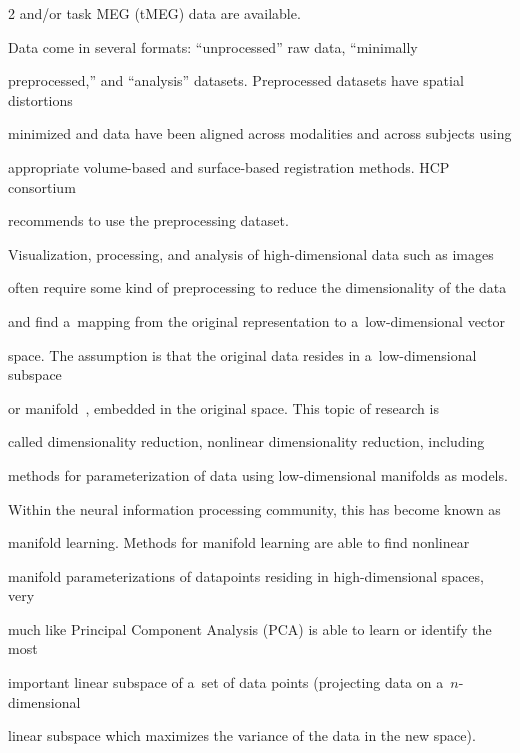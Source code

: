 \begin{multicols}{2}
and/or task MEG (tMEG) data are available.





  Data come in several formats: ``unprocessed'' raw data, ``minimally


preprocessed,'' and ``analysis'' datasets. Preprocessed datasets have spatial distortions


minimized and data have been aligned across modalities and across subjects using


appropriate volume-based and surface-based registration methods. HCP consortium


recommends to use the preprocessing dataset.





  Visualization, processing, and analysis of high-dimensional data such as images


often require some kind of preprocessing to reduce the dimensionality of the data


and find a~mapping from the original representation to a~low-dimensional vector


space. The assumption is that the original data resides in a~low-dimensional subspace


or manifold~\cite{69-kl}, embedded in the original space. This topic of research is


called dimensionality reduction, nonlinear dimensionality reduction, including


methods for parameterization of data using low-dimensional manifolds as models.


Within the neural information processing community, this has become known as


manifold learning. Methods for manifold learning are able to find nonlinear


manifold parameterizations of datapoints residing in high-dimensional spaces, very


much like Principal Component Analysis (PCA) is able to learn or identify the most


important linear subspace of a~set of data points (projecting data on a~$n$-dimensional


linear subspace which maximizes the variance of the data in the new space).


{





}






\end{multicols}
